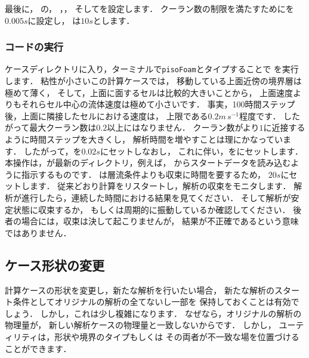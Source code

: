 最後に，
%
%
の，
，，
そしてを設定します．
クーラン数の制限を満たすためにを$0.005\unit{s}$に設定し，
は$10\unit{s}$とします．

\subsubsection{コードの実行}
\label{sssec:2.1.8.2}
ケースディレクトリに入り，ターミナルで\texttt{pisoFoam}とタイプすることで
を実行します．
粘性が小さいこの計算ケースでは，
移動している上面近傍の境界層は極めて薄く，
そして，上面に面するセルは比較的大きいことから，
上面速度よりもそれらセル中心の流体速度は極めて小さいです．
事実，100時間ステップ後，上面に隣接したセルにおける速度は，
上限である$0.2\unit{m\,s^{-1}}$程度です．
したがって最大クーラン数は$0.2$以上にはなりません．
クーラン数がより$1$に近接するように時間ステップを大きくし，
解析時間を増やすことは理にかなっています．
したがって，を$0.02\unit{s}$にセットしなおし，
これに伴い，をにセットします．
本操作は，が最新のディレクトリ，例えば，
からスタートデータを読み込むように指示するものです．
は層流条件よりも収束に時間を要するため，
$20\unit{s}$にセットします．
従来どおり計算をリスタートし，解析の収束をモニタします．
解析が進行したら，連続した時間における結果を見てください．
そして解析が安定状態に収束するか，
もしくは周期的に振動しているか確認してください．
後者の場合には，収束は決して起こりませんが，
結果が不正確であるという意味ではありません．


\subsection{ケース形状の変更}
\label{ssec:2.1.9}
計算ケースの形状を変更し，新たな解析を行いたい場合，
新たな解析のスタート条件としてオリジナルの解析の全てないし一部を
保持しておくことは有効でしょう．
しかし，これは少し複雑になります．
なぜなら，オリジナルの解析の物理量が，
新しい解析ケースの物理量と一致しないからです．
しかし，
%
%
ユーティリティは，形状や境界のタイプもしくは
その両者が不一致な場を位置づけることができます．

